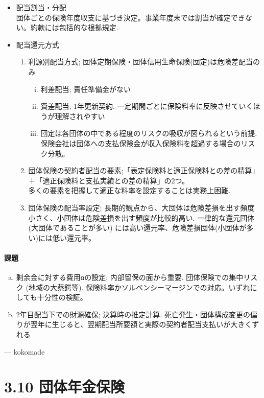 \documentclass[report,gutter=10mm,fore-edge=10mm,uplatex,dvipdfmx]{jlreq}
\begin{document}
\begin{itemize}
 \item 配当割当・分配\\
団体ごとの保険年度収支に基づき決定。事業年度末では割当が確定できない。約款には包括的な根拠規定. 
 \item 配当還元方式
\begin{enumerate}[(1)]
 \item 利源別配当方式; 団体定期保険・団体信用生命保険(団定)は危険差配当のみ
\begin{enumerate}[(i)]
 \item 利差配当; 責任準備金がない
 \item 費差配当; 1年更新契約. 一定期間ごとに保険料率に反映させていくほうが理解されやすい
 \item 団定は各団体の中である程度のリスクの吸収が図られるという前提. 保険会社は団体への支払保険金が収入保険料を超過する場合のリスク分散。
\end{enumerate}
 \item 団体保険の契約者配当の要素;「表定保険料と適正保険料との差の精算」＋「適正保険料と支払実績との差の精算」の2つ。\\
多くの要素を把握して適正な料率を設定することは実務上困難. 
 \item 団体保険の配当率設定; 長期的観点から、大団体は危険差損を出す頻度小さく、小団体は危険差損を出す頻度が比較的高い. 一律的な還元団体(大団体であることが多い) には高い還元率、危険差損団体(小団体が多い)には低い還元率。
\end{enumerate}
\end{itemize}

\paragraph{課題}

\begin{enumerate} [(a)]
 \item 剰余金に対する費用αの設定; 内部留保の面から重要. 団体保険での集中リスク (地域の大蔡鍔等). 保険料率かソルベンシーマージンでの対応。いずれにしても十分性の検証。
 \item 2年目配当下での財源確保; 決算時の推定計算. 死亡発生・団体構成変更の偏りが翌年に生じると、翌期配当所要額と実際の契約者配当支払いが大きくずれる
\end{enumerate}

--- kokomade


\section{3.10 団体年金保険}
\end{document}
